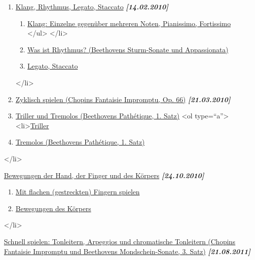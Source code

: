 \begin{enumerate} 
 \item \hyperref[c1iii1]{Klang, Rhythmus, Legato, Staccato} \textbf{\textit{[14.02.2010]}}
  \begin{enumerate}[label={\alph*.}] 
   <li>\hyperref[c1iii1a]{Was ist ein \enquote{Guter Klang}?}
   <ul type=\enquote{circle}>
    <li>\hyperref[c1iii1a1]{Der Basisanschlag}
    \item \hyperref[c1iii1a2]{Klang: Einzelne gegenüber mehreren Noten, Pianissimo, Fortissimo}
   </ul>
   </li>
   \item \hyperref[c1iii1b]{Was ist Rhythmus? (Beethovens Sturm-Sonate und Appassionata)}
   \item \hyperref[c1iii1c]{Legato, Staccato}
  \end{enumerate}
 </li>
 \item \hyperref[c1iii2]{Zyklisch spielen (Chopins Fantaisie Impromptu, Op. 66)} \textbf{\textit{[21.03.2010]}}

 \item \hyperref[c1iii3]{Triller und Tremolos (Beethovens Pathétique, 1. Satz)}
  <ol type=\enquote{a}>
   <li>\hyperref[c1iii3]{Triller}
   \item \hyperref[c1iii3b]{Tremolos (Beethovens Pathétique, 1. Satz)}
   \end{enumerate}
 </li>
 \item \hyperref[c1iii4]{Bewegungen der Hand, der Finger und des Körpers} \textbf{\textit{[24.10.2010]}}
  \begin{enumerate}[label={\alph*.}] 
   <li>\hyperref[c1iii4]{Bewegungen der Hand}
   \item \hyperref[c1iii4b]{Mit flachen (gestreckten) Fingern spielen}
   \item \hyperref[c1iii4c]{Bewegungen des Körpers}
   \end{enumerate}
 </li>
 \item \hyperref[c1iii5]{Schnell spielen: Tonleitern, Arpeggios und chromatische Tonleitern (Chopins Fantaisie Impromptu und Beethovens Mondschein-Sonate, 3. Satz)} \textbf{\textit{[21.08.2011]}}
